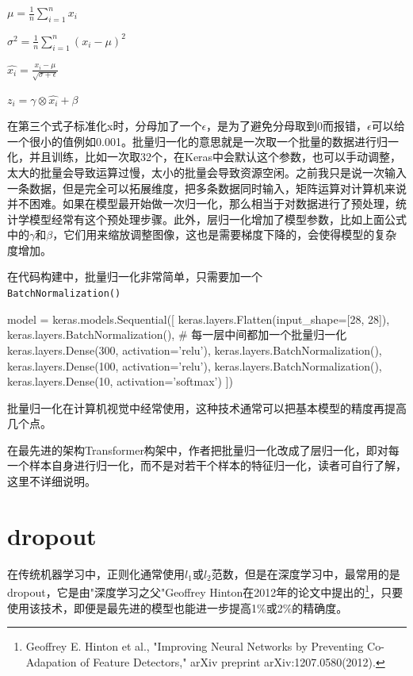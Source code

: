 \documentclass[a5paper, 11pt]{ctexbook}
\begin{document}
$\mu = \frac{1}{n}\sum^{n}_{i=1}x_i$

$\sigma^2 = \frac{1}{n}\sum^{n}_{i=1}(x_i-\mu)^2$

$\hat{x_i} = \frac{x_i-\mu}{\sqrt{\sigma+\epsilon}}$

$z_i = \gamma\otimes\hat{x_i}+\beta$

在第三个式子标准化x时，分母加了一个$\epsilon$，是为了避免分母取到0而报错，$\epsilon$可以给一个很小的值例如0.001。批量归一化的意思就是一次取一个批量的数据进行归一化，并且训练，比如一次取32个，在Keras中会默认这个参数，也可以手动调整，太大的批量会导致运算过慢，太小的批量会导致资源空闲。之前我只是说一次输入一条数据，但是完全可以拓展维度，把多条数据同时输入，矩阵运算对计算机来说并不困难。如果在模型最开始做一次归一化，那么相当于对数据进行了预处理，统计学模型经常有这个预处理步骤。此外，层归一化增加了模型参数，比如上面公式中的$\gamma$和$\beta$，它们用来缩放调整图像，这也是需要梯度下降的，会使得模型的复杂度增加。

在代码构建中，批量归一化非常简单，只需要加一个\\
\verb|BatchNormalization()|

\begin{python}
    model = keras.models.Sequential([
    keras.layers.Flatten(input_shape=[28, 28]),
    keras.layers.BatchNormalization(),
    # 每一层中间都加一个批量归一化
    keras.layers.Dense(300, activation='relu'),
    keras.layers.BatchNormalization(),
    keras.layers.Dense(100, activation='relu'),
    keras.layers.BatchNormalization(),
    keras.layers.Dense(10, activation='softmax')
    ])
\end{python}

批量归一化在计算机视觉中经常使用，这种技术通常可以把基本模型的精度再提高几个点。

在最先进的架构Transformer构架中，作者把批量归一化改成了层归一化，即对每一个样本自身进行归一化，而不是对若干个样本的特征归一化，读者可自行了解，这里不详细说明。

\section{dropout}

在传统机器学习中，正则化通常使用$l_1$或$l_2$范数，但是在深度学习中，最常用的是dropout，它是由"深度学习之父"Geoffrey Hinton在2012年的论文中提出的\footnote{Geoffrey E. Hinton et al., "Improving Neural Networks by Preventing Co-Adapation of Feature Detectors," arXiv preprint arXiv:1207.0580(2012).}，只要使用该技术，即便是最先进的模型也能进一步提高1\%或2\%的精确度。
\end{document}
